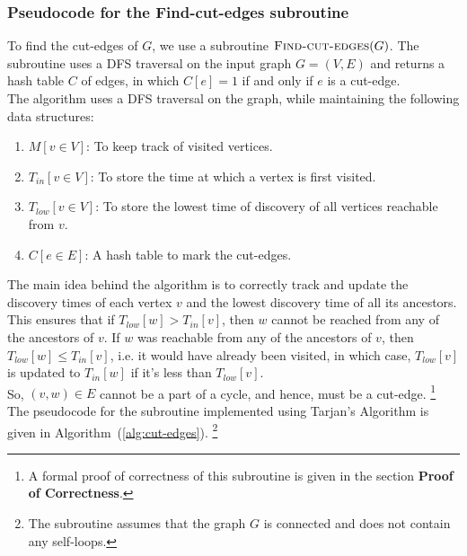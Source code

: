 \documentclass[12pt]{report}
\begin{document}
    \subsubsection*{Pseudocode for the Find-cut-edges subroutine}
    To find the cut-edges of $G$, we use a subroutine $\Call{Find-cut-edges}{G}$.
    The subroutine uses a DFS traversal on the input graph $G = (V, E)$ and returns a hash table $C$ of edges, in which
    $C[e] = 1$ if and only if $e$ is a cut-edge.
    \vspace*{10pt} \\
    The algorithm uses a DFS traversal on the graph, while maintaining the following data structures:
    \begin{enumerate}
        \item $M[v \in V]$: To keep track of visited vertices.
        \item $T_{in}[v \in V]$: To store the time at which a vertex is first visited.
        \item $T_{low}[v \in V]$: To store the lowest time of discovery of all vertices reachable from $v$.
        \item $C[e \in E]$: A hash table to mark the cut-edges.
    \end{enumerate}
    The main idea behind the algorithm is to correctly track and update the discovery times of each vertex $v$ and the lowest discovery time of all its ancestors.
    \vspace*{10pt} \\
    This ensures that if $T_{low}[w] > T_{in}[v]$, then $w$ cannot be reached from any of the ancestors of $v$.
    If $w$ was reachable from any of the ancestors of $v$, then $T_{low}[w] \leq T_{in}[v]$, i.e. it would have already been visited,
    in which case, $T_{low}[v]$ is updated to $T_{in}[w]$ if it's less than $T_{low}[v]$. \\
    So, $(v, w) \in E$ cannot be a part of a cycle, and hence, must be a cut-edge.
    \footnote{
        A formal proof of correctness of this subroutine is given in the section \textbf{Proof of Correctness}.
    }
    \vspace*{10pt} \\
    The pseudocode for the subroutine implemented using Tarjan's Algorithm is given in Algorithm~(\ref{alg:cut-edges}).
    \footnote{
        The subroutine assumes that the graph $G$ is connected and does not contain any self-loops.
    }
\end{document}
